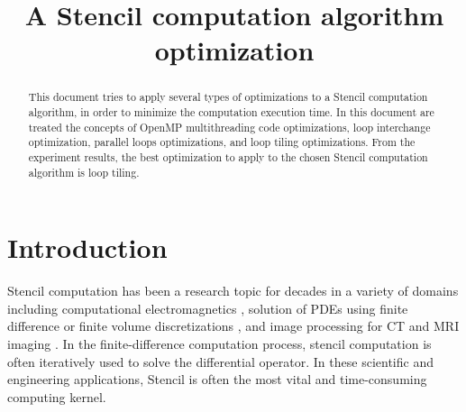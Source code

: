 \documentclass[conference]{IEEEtran}
\begin{document}
\title{A Stencil computation algorithm optimization}


\author{
}

\maketitle

\begin{abstract}
This document tries to apply several types of optimizations to a Stencil computation algorithm, in order to minimize the computation execution time. In this document are treated the concepts of OpenMP multithreading code optimizations, loop interchange optimization, parallel loops optimizations, and loop tiling optimizations. From the experiment results, the best optimization to apply to the chosen Stencil computation algorithm is loop tiling.
\end{abstract}

\section{Introduction}\label{sec:intro}

Stencil computation has been a research topic for decades in a variety of domains including computational electromagnetics \cite{taflove}, solution of PDEs using finite difference or finite volume discretizations \cite{smith}, and image processing for CT and MRI imaging \cite{cong-huang-zou}\cite{cong-zou}. In the finite-difference computation process, stencil computation is often iteratively used to solve the differential operator. In these scientific and engineering applications, Stencil is often the most vital and time-consuming computing kernel.\cite{su-zhang-mei}
\end{document}
